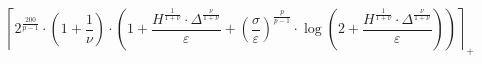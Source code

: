 \[\left\lceil 2^{\frac{200}{p - 1}} \cdot \left(1 + \frac{1}{\nu}\right) \cdot \left(1 + \frac{H^{\frac{1}{1 + \nu}} \cdot \Delta^{\frac{\nu}{1 + \nu}}}{\varepsilon} + \left(\frac{\sigma}{\varepsilon}\right)^{\frac{p}{p - 1}} \cdot \log\left(2 + \frac{H^{\frac{1}{1 + \nu}} \cdot \Delta^{\frac{\nu}{1 + \nu}}}{\varepsilon}\right)\right) \right\rceil_{+}\]
